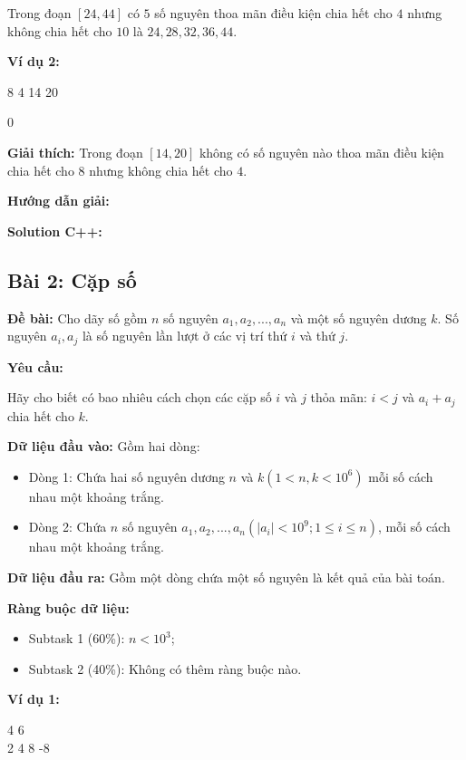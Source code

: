\documentclass[12pt]{scrartcl}  %
\begin{document}
Trong đoạn $[24, 44]$ có $5$ số nguyên thoa mãn điều kiện chia hết cho $4$ nhưng không chia hết cho $10$ là $24, 28, 32, 36, 44$.

\textbf{Ví dụ 2:}
\begin{tcolorbox}[colback=gray!5!white, colframe=blue!50!black, title=Input]
8 4 14 20
\end{tcolorbox}
\begin{tcolorbox}[colback=gray!5!white, colframe=green!50!black, title=Output]
0
\end{tcolorbox}

\textbf{Giải thích:}
Trong đoạn $[14, 20]$ không có số nguyên nào thoa mãn điều kiện chia hết cho $8$ nhưng không chia hết cho $4$.

\textbf{Hướng dẫn giải:}

\textbf{Solution C++:}

\subsection{Bài 2: Cặp số}
\textbf{Đề bài:}
Cho dãy số gồm $n$ số nguyên $a_1, a_2, ... , a_n$ và một số nguyên dương $k$. Số nguyên $a_i, a_j$ là số nguyên lần lượt ở các vị trí thứ $i$ và thứ $j$.

\textbf{Yêu cầu:}

Hãy cho biết có bao nhiêu cách chọn các cặp số $i$ và $j$ thỏa mãn: $i < j$ và $a_i + a_j$ chia hết cho $k$. 

\textbf{Dữ liệu đầu vào:}
Gồm hai dòng:
\begin{itemize}
    \item Dòng 1: Chứa hai số nguyên dương $n$ và $k (1 < n, k < 10^6)$ mỗi số cách nhau một khoảng trắng.
    \item Dòng 2: Chứa $n$ số nguyên $a_1, a_2, ... , a_n (| a_i | < 10^9; 1 \leq i \leq n)$, mỗi số cách nhau một khoảng trắng.
\end{itemize}

\textbf{Dữ liệu đầu ra:}
Gồm một dòng chứa một số nguyên là kết quả của bài toán.

\textbf{Ràng buộc dữ liệu:}

\begin{itemize}
    \item Subtask 1 (60\%): $n < 10^3$;
    \item Subtask 2 (40\%): Không có thêm ràng buộc nào.
\end{itemize}

\textbf{Ví dụ 1:}
\begin{tcolorbox}[colback=gray!5!white, colframe=blue!50!black, title=Input]
4 6\\
2 4 8 -8
\end{tcolorbox}
\end{document}
